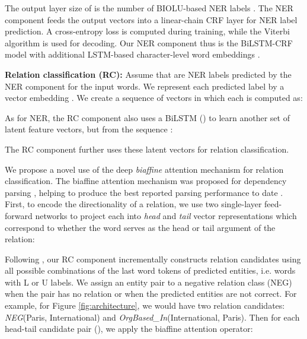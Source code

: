 \documentclass[runningheads]{llncs}
\begin{document}
 

\noindent The output layer size of  is the number of BIOLU-based NER labels \cite{ratinov-roth:2009:CoNLL}. 
The  NER component feeds the output vectors   into a linear-chain CRF layer \cite{Lafferty:2001} for NER label  prediction. A cross-entropy loss  is computed during training, while the Viterbi algorithm is used for decoding. Our NER component thus is the BiLSTM-CRF model  \cite{HuangXY15} with additional LSTM-based character-level word embeddings \cite{lample-EtAl:2016:N16-1}.

\medskip

\noindent\textbf{Relation classification (RC):}   Assume that  are   NER labels predicted by the NER component for the input words.
We represent each  predicted label by a vector embedding . We  create a sequence of vectors  in which each  is computed as:



\noindent As for NER, the RC component also uses a BiLSTM ()  to learn another set of latent feature vectors, but from the  sequence :



\noindent  The  RC component  further  uses these latent vectors   for relation classification. 

We propose a novel use of the  deep \textit{biaffine} attention mechanism \cite{DozatM17} for relation classification.  The {biaffine} attention mechanism was proposed for dependency parsing \cite{DozatM17}, helping to produce the best reported   parsing  performance to date \cite{dozat-qi-manning:2017:K17-3}. First, to encode the directionality of a relation, we use two single-layer feed-forward networks to project each   into \textit{head} and \textit{tail} vector representations which correspond to whether the  word serves as the head or tail argument of the relation:



Following \cite{miwa-bansal:2016:P16-1}, our RC component incrementally constructs relation candidates using all possible combinations of the last word tokens of predicted entities, i.e. words with L or U labels. We assign an entity pair to a negative relation class (NEG) when the  pair has no relation or when the predicted entities are not correct. For example, for  Figure \ref{fig:architecture}, we would have two relation candidates: \textsl{NEG}(Paris, International) and \textsl{OrgBased\_In}(International, Paris). 
  Then for each head-tail candidate pair (), we  apply the biaffine attention operator: 
\end{document}
